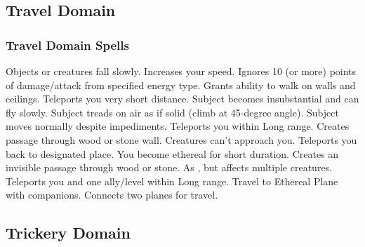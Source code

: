 \subsection{Travel Domain}

\subsubsection{Travel Domain Spells}
\begin{spelllist}
 Objects or creatures fall slowly.
 Increases your speed.
 Ignores 10 (or more) points of damage/attack from specified energy type.
 Grants ability to walk on walls and ceilings.
 Teleports you very short distance.
 Subject becomes insubstantial and can fly slowly.
 Subject treads on air as if solid (climb at 45-degree angle).
 Subject moves normally despite impediments.
 Teleports you within Long range.
 Creates passage through wood or stone wall.
 Creatures can't approach you.
 Teleports you back to designated place.
 You become ethereal for short duration.
 Creates an invisible passage through wood or stone.
 As , but affects multiple creatures.
 Teleports you and one ally/level within Long range.
 Travel to Ethereal Plane with companions.
 Connects two planes for travel.
\end{spelllist}

\subsection{Trickery Domain}
